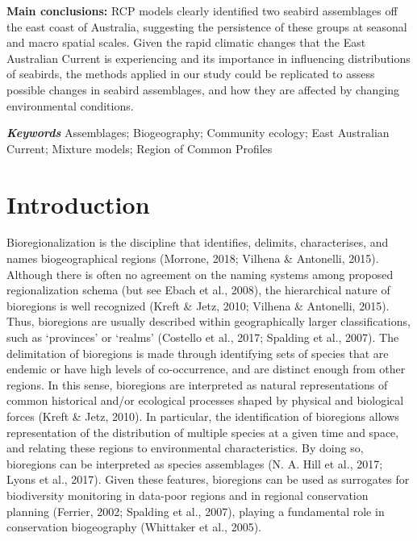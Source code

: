 \documentclass{article}
\begin{document}
\begin{linenumbers}
\textbf{Main conclusions:} RCP models clearly identified two seabird assemblages off the east coast of Australia, suggesting the persistence of these groups at seasonal and macro spatial scales. Given the rapid climatic changes that the East Australian Current is experiencing and its importance in influencing distributions of seabirds, the methods applied in our study could be replicated to assess possible changes in seabird assemblages, and how they are affected by changing environmental conditions.

\textbf{\emph{Keywords}} Assemblages; Biogeography; Community ecology; East Australian Current; Mixture models; Region of Common Profiles

\newpage

\hypertarget{introduction}{%
\section{Introduction}\label{introduction}}

Bioregionalization is the discipline that identifies, delimits, characterises, and names biogeographical regions (Morrone, 2018; Vilhena \& Antonelli, 2015). Although there is often no agreement on the naming systems among proposed regionalization schema (but see Ebach et al., 2008), the hierarchical nature of bioregions is well recognized (Kreft \& Jetz, 2010; Vilhena \& Antonelli, 2015). Thus, bioregions are usually described within geographically larger classifications, such as `provinces' or `realms' (Costello et al., 2017; Spalding et al., 2007). The delimitation of bioregions is made through identifying sets of species that are endemic or have high levels of co-occurrence, and are distinct enough from other regions. In this sense, bioregions are interpreted as natural representations of common historical and/or ecological processes shaped by physical and biological forces (Kreft \& Jetz, 2010). In particular, the identification of bioregions allows representation of the distribution of multiple species at a given time and space, and relating these regions to environmental characteristics. By doing so, bioregions can be interpreted as species assemblages (N. A. Hill et al., 2017; Lyons et al., 2017). Given these features, bioregions can be used as surrogates for biodiversity monitoring in data-poor regions and in regional conservation planning (Ferrier, 2002; Spalding et al., 2007), playing a fundamental role in conservation biogeography (Whittaker et al., 2005).


\end{linenumbers}
\end{document}
